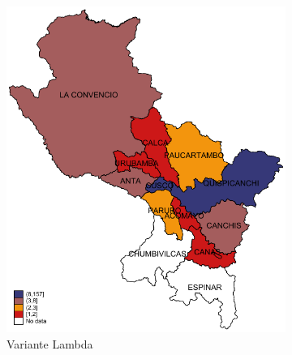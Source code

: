 \documentclass[12pt,a4paper,openany]{book}
\begin{document}
			\begin{figure}[h]
				\caption{Distribución provincial de las variantes de SARS-CoV-2 aisladas en la Región Cusco hasta la SE 03-2022.}
				\label{fig:mapa_variantes}
				\centering
				\begin{subfigure}[b]{0.40\textwidth}
					\centering
					\includegraphics[width=\textwidth]{../figuras/variantes_provincial_lambda.pdf}
					\caption{Variante Lambda}
				\end{subfigure}
				\hfill
				\begin{subfigure}[b]{0.40\textwidth}
					\centering

\end{subfigure}
\end{figure}
\end{document}

